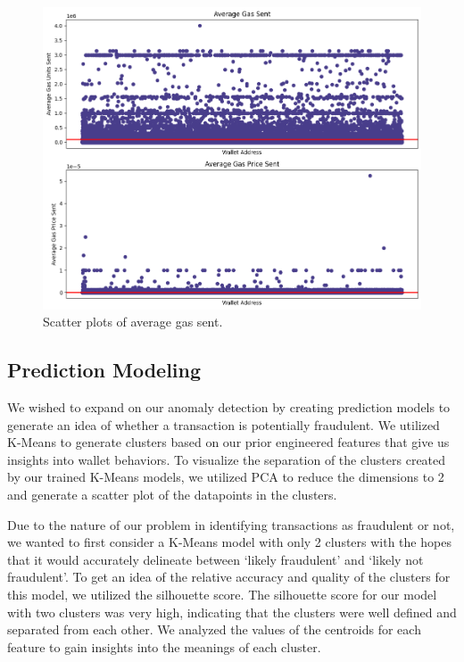 \documentclass[sigconf]{acmart}
\begin{document}
\begin{figure}[H]
    \centering
    \includegraphics[width=0.8\linewidth]{M6-2-avg-gas-sent.png}
    \caption{Scatter plots of average gas sent.}
    \label{fig:m6StackedAvgGasSent}
\end{figure}
	

\subsection{Prediction Modeling}
We wished to expand on our anomaly detection by creating prediction models to generate an idea of whether a transaction is potentially fraudulent. We utilized K-Means to generate clusters based on our prior engineered features that give us insights into wallet behaviors. To visualize the separation of the clusters created by our trained K-Means models, we utilized PCA to reduce the dimensions to 2 and generate a scatter plot of the datapoints in the clusters.  

Due to the nature of our problem in identifying transactions as fraudulent or not, we wanted to first consider a K-Means model with only 2 clusters with the hopes that it would accurately delineate between ‘likely fraudulent’ and ‘likely not fraudulent’. To get an idea of the relative accuracy and quality of the clusters for this model, we utilized the silhouette score. The silhouette score for our model with two clusters was very high, indicating that the clusters were well defined and separated from each other. We analyzed the values of the centroids for each feature to gain insights into the meanings of each cluster.  
\end{document}
